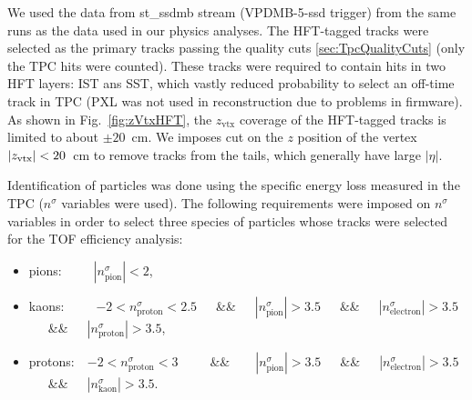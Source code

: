 We used the data from st\_ssdmb stream (VPDMB-5-ssd trigger) from the same runs as the data used in our physics analyses. The HFT-tagged tracks were selected as the primary tracks passing the quality cuts \ref{sec:TpcQualityCuts} (only the TPC hits were counted). These tracks were required to contain hits in two HFT layers: IST ans SST, which vastly reduced probability to select an off-time track in TPC (PXL was not used in reconstruction due to problems in firmware). As shown in Fig.~\ref{fig:zVtxHFT}, the $z_{\text{vtx}}$ coverage of the HFT-tagged tracks is limited to about $\pm20$~cm. We imposes cut on the $z$ position of the vertex $|z_{\text{\text{vtx}}}|<20$~cm to remove tracks from the tails, which generally have large $|\eta|$.

Identification of particles was done using the specific energy loss measured in the TPC ($n^{\sigma}$ variables were used). The following requirements were imposed on $n^{\sigma}$ variables in order to select three species of particles whose tracks were selected for the TOF efficiency analysis:
\begin{itemize}
 \item pions:~~~~~$|n^{\sigma}_{\text{pion}}| < 2$,
 \item kaons:~~~~~$-2 < n^{\sigma}_{\text{proton}} < 2.5$~~~\&\&~~~$|n^{\sigma}_{\text{pion}}| > 3.5$~~~\&\&~~~$|n^{\sigma}_{\text{electron}}| > 3.5$~~~\&\&~~~$|n^{\sigma}_{\text{proton}}| > 3.5$,
 \item protons:~~$-2 < n^{\sigma}_{\text{proton}} < 3$~~~~~\&\&~~~~$|n^{\sigma}_{\text{pion}}| > 3.5$~~~\&\&~~~$|n^{\sigma}_{\text{electron}}| > 3.5$~~~\&\&~~~$|n^{\sigma}_{\text{kaon}}| > 3.5$.
\end{itemize}

